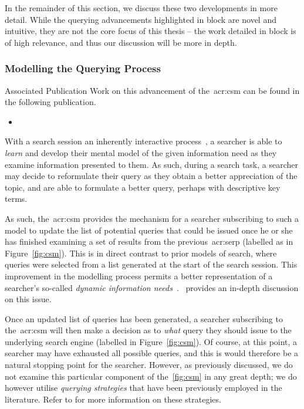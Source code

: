 In the remainder of this section, we discuss these two developments in more detail. While the querying advancements highlighted in block  are novel and intuitive, they are not the core focus of this thesis -- the work detailed in block  is of high relevance, and thus our discussion will be more in depth.

\subsubsection{Modelling the Querying Process}
\begin{publications_box}{Associated Publication}
Work on this advancement of the~\gls{acr:csm} can be found in the following publication.
\vspace*{-2mm}
\begin{itemize}
    \item{}
\end{itemize}
\end{publications_box}

With a search session an inherently interactive process~\citep{ingwersen2005theturn}, a searcher is able to \emph{learn} and develop their mental model of the given information need as they examine information presented to them. As such, during a search task, a searcher may decide to reformulate their query as they obtain a better appreciation of the topic, and are able to formulate a better query, perhaps with descriptive key terms.

As such, the~\gls{acr:csm} provides the mechanism for a searcher subscribing to such a model to update the list of potential queries that could be issued once he or she has finished examining a set of results from the previous~\gls{acr:serp} (labelled as  in Figure~\ref{fig:csm}). This is in direct contrast to prior models of search, where queries were selected from a list generated at the start of the search session. This improvement in the modelling process permits a better representation of a searcher's so-called \emph{dynamic information needs}~\citep{borlund2003iir_model}.~\cite{maxwell2016agents} provides an in-depth discussion on this issue.

Once an updated list of queries has been generated, a searcher subscribing to the~\gls{acr:csm} will then make a decision as to \emph{what} query they should issue to the underlying search engine (labelled  in Figure~\ref{fig:csm}). Of course, at this point, a searcher may have exhausted all possible queries, and this is would therefore be a natural stopping point for the searcher. However, as previously discussed, we do not examine this particular component of the~\ref{fig:csm} in any great depth; we do however utilise \emph{querying strategies} that have been previously employed in the literature. Refer to  for more information on these strategies.


